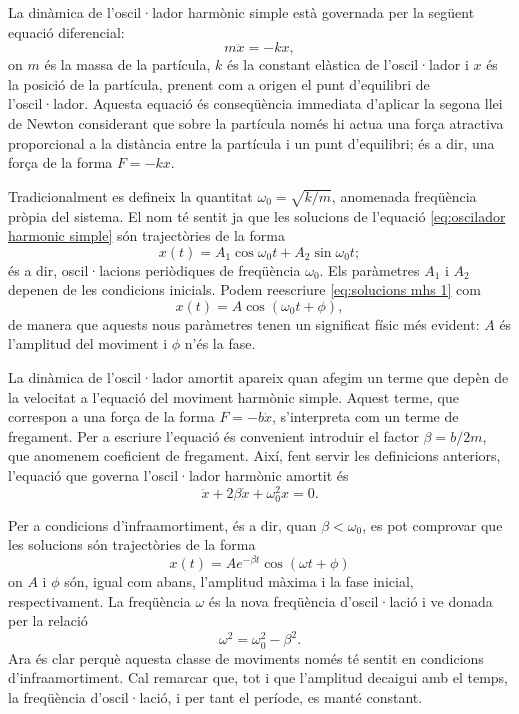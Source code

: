 La dinàmica de l'oscil·lador harmònic simple està governada per la següent equació diferencial:
\begin{equation}
 	m\ddot{x} = -kx, \label{eq:oscilador harmonic simple}
\end{equation}
on \( m \) és la massa de la partícula, \( k \) és la constant elàstica de l'oscil·lador i \( x \) és la posició de la partícula, prenent com a origen el punt d'equilibri de l'oscil·lador. Aquesta equació és conseqüència immediata d'aplicar la segona llei de Newton considerant que sobre la partícula només hi actua una força atractiva proporcional a la distància entre la partícula i un punt d'equilibri; és a dir, una força de la forma \( F = -kx \). 

Tradicionalment es defineix la quantitat \( \omega_0 = \sqrt{k / m} \), anomenada freqüència pròpia del sistema. El nom té sentit ja que les solucions de l'equació \ref{eq:oscilador harmonic simple} són trajectòries de la forma
\begin{equation}
  x(t) = A_1\cos{\omega_0 t} + A_2\sin{\omega_0 t}; \label{eq:solucions mhs 1}
\end{equation}
és a dir, oscil·lacions periòdiques de freqüència \( \omega_0 \). Els paràmetres \( A_1 \) i \( A_2 \) depenen de les condicions inicials. Podem reescriure \ref{eq:solucions mhs 1} com
\begin{equation}
  x(t) = A\cos({\omega_0 t + \phi}), \label{eq:solucions mhs 2}
\end{equation}
de manera que aquests nous paràmetres tenen un significat físic més evident: \( A \) és l'amplitud del moviment i \( \phi \) n'és la fase.

La dinàmica de l'oscil·lador amortit apareix quan afegim un terme que depèn de la velocitat a l'equació del moviment harmònic simple. Aquest terme, que correspon a una força de la forma \( F = -b\dot{x} \), s'interpreta com un terme de fregament. Per a escriure l'equació és convenient introduir el factor \( \beta = b/2m \), que anomenem coeficient de fregament. Així, fent servir les definicions anteriors, l'equació que governa l'oscil·lador harmònic amortit és
\begin{equation}
  \ddot{x} + 2\beta \dot{x} + \omega_0^2 x = 0. \label{eq:oscilador harmonic amortit}
\end{equation}

Per a condicions d'infraamortiment, és a dir, quan \( \beta < \omega_0 \), es pot comprovar que les solucions són trajectòries de la forma
\begin{equation}
  x(t) = Ae^{-\beta t}\cos({\omega t + \phi}) \label{eq:solucions mha}
\end{equation}
on \( A \) i \( \phi \) són, igual com abans, l'amplitud màxima i la fase inicial, respectivament. La freqüència \( \omega \) és la nova freqüència d'oscil·lació i ve donada per la relació
\begin{equation}
  \omega^2 = \omega_0^2 - \beta^2. \label{eq:nova frequencia}
\end{equation}
Ara és clar perquè aquesta classe de moviments només té sentit en condicions d'infraamortiment. Cal remarcar que, tot i que l'amplitud decaigui amb el temps, la freqüència d'oscil·lació, i per tant el període, es manté constant. 

